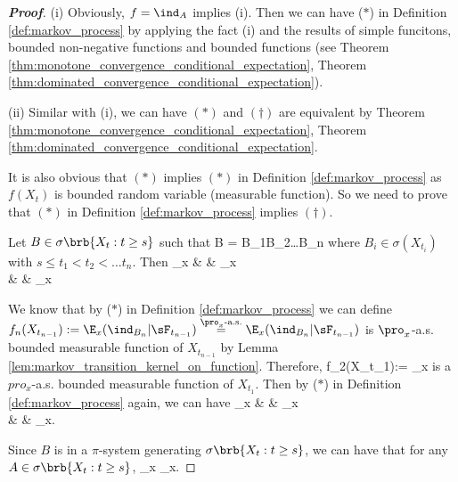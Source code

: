 \begin{proof}[\bf Proof]
\ben
\item [(i)] Obviously, $f = \ind_A$ implies (i). Then we can have ($*$) in Definition \ref{def:markov_process} by applying the fact (i) and the results of simple funcitons, bounded non-negative functions and bounded functions (see Theorem \ref{thm:monotone_convergence_conditional_expectation}, Theorem \ref{thm:dominated_convergence_conditional_expectation}).

\item [(ii)] Similar with (i), we can have $(*)$ and $(\dag)$ are equivalent by Theorem \ref{thm:monotone_convergence_conditional_expectation}, Theorem \ref{thm:dominated_convergence_conditional_expectation}.

It is also obvious that $(*)$ implies $(*)$ in Definition \ref{def:markov_process} as $f(X_t)$ is bounded random variable (measurable function). So we need to prove that $(*)$ in Definition \ref{def:markov_process} implies $(\dag)$.

Let $B\in \sigma\brb{X_t:t\geq s}$ such that
\be
B = B_1\cap B_2\cap \dots \cap B_n
\ee
where $B_i \in \sigma(X_{t_i})$ with $s\leq t_1<t_2<\dots t_n$. Then
\beast
\E_x &  & \E_x \\
&  & \E_x
\eeast

We know that by ($*$) in Definition \ref{def:markov_process} we can define $f_n(X_{t_{n-1}}) := \E_x(\ind_{B_n}|\sF_{t_{n-1}}) \stackrel{\pro_x\text{-a.s.}}{=}  \E_x(\ind_{B_n}|\sF_{t_{n-1}})$ is $\pro_x$-a.s. bounded measurable function of $X_{t_{n-1}}$ by Lemma \ref{lem:markov_transition_kernel_on_function}. Therefore,
\be
f_2(X_{t_1}):= \E_x
\ee
is a $pro_x$-a.s. bounded measurable function of $X_{t_1}$. Then by ($*$) in Definition \ref{def:markov_process} again, we can have
\beast
\E_x  &  & \E_x \\
&   & \E_x.
\eeast

Since $B$ is in a $\pi$-system generating $\sigma\brb{X_t:t\geq s}$, we can have that for any $A\in \sigma\brb{X_t:t\geq s}$,
\be
\E_x   \E_x.
\ee


\end{proof}
